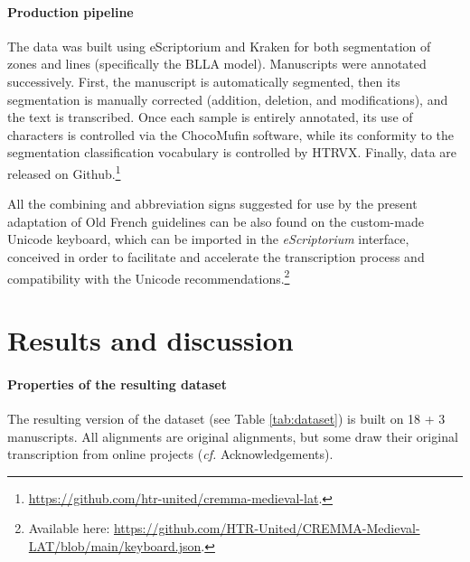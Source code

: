 \documentclass{article}
\begin{document}
\paragraph{Production pipeline}

The data was built using eScriptorium and Kraken for both segmentation of zones and lines (specifically the BLLA model). Manuscripts were annotated successively. First, the manuscript is automatically segmented, then its segmentation is manually corrected (addition, deletion, and modifications), and the text is transcribed. Once each sample is entirely annotated, its use of characters is controlled via the ChocoMufin software, while its conformity to the segmentation classification vocabulary is controlled by HTRVX. Finally, data are released on Github.\footnote{\url{https://github.com/htr-united/cremma-medieval-lat}.}

All the combining and abbreviation signs suggested for use by the present adaptation of Old French guidelines can be also found on the custom-made Unicode keyboard, which can be imported in the \textit{eScriptorium} interface, conceived in order to facilitate and accelerate the transcription process and compatibility with the Unicode recommendations.\footnote{Available here: \url{https://github.com/HTR-United/CREMMA-Medieval-LAT/blob/main/keyboard.json}.}

\section{Results and discussion}

\paragraph{Properties of the resulting dataset}

The resulting version of the dataset (see Table \ref{tab:dataset}) is built on 18 + 3 manuscripts. All alignments are original alignments, but some draw their original transcription from online projects (\textit{cf.} Acknowledgements).
\end{document}
